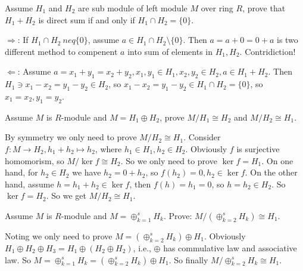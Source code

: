 \documentclass{ctexart}
\newif\ifpreface
\begin{document}
\large
\setlength{\baselineskip}{1.2em}
\ifpreface
	
	\newgeometry{left=2cm,right=2cm,top=2cm,bottom=2cm}
\else
	\maketitle
\fi
\begin{problem}\label{pro:1}
 Assume $H_1$ and $H_2$ are sub module of left module $M$ over ring $R$, prove that $H_1+H_2$ is direct sum if and only if $H_1\cap H_2 = \{0\}$. 
\end{problem}

\begin{solution}
 $\Rightarrow$: If $H_1 \cap H_2 \ neq \{0\}$, assume $a\in H_1\cap H_2\setminus \{0\}$. 
 Then $a=a+0=0+a$ is two different method to compenent $a$ into sum of elements in $H_1,H_2$. Contridiction! 

 $\Leftarrow$: Assume $a=x_1+y_1=x_2+y_2,x_1,y_1\in H_1,x_2,y_2\in H_2,a\in H_1+H_2$. 
 Then $H_1\ni x_1-x_2=y_1-y_2\in H_2$, so $x_1-x_2=y_1-y_2\in H_1\cap H_2=\{0\}$, so $x_1=x_2,y_1=y_2$.  
\end{solution}

\begin{problem}\label{pro:2}
 Assume $M$ is $R$-module and $M=H_1\oplus H_2$, prove $M/H_1\cong H_2$ and $M/H_2\cong H_1$. 
\end{problem}

\begin{solution}
 By symmetry we only need to prove $M/H_2\cong H_1$. 
 Consider $f:M\to H_2,h_1+h_2\mapsto h_2$, where $h_1\in H_1,h_2\in H_2$. 
 Obviously $f$ is surjective homomorism, so $M/\ker f\cong H_2$. 
 So we only need to prove $\ker f= H_1$. 
 On one hand, for $h_2\in H_2$ we have $h_2=0+h_2$, so $f(h_2)=0,h_2\in \ker f$. 
 On the other hand, assume $h=h_1+h_2\in \ker f$, then $f(h)=h_1=0$, so $h=h_2\in H_2$. 
 So $\ker f=H_2$. So we get $M/H_2\cong H_1$. 
\end{solution}

\begin{problem}
 Assume $M$ is $R$-module and $M=\oplus_{k=1}^s H_k$. Prove: $M/(\oplus_{k=2}^s H_k)\cong H_1$. 
\end{problem}

\begin{solution}
 Noting  we only need to prove $M=(\oplus_{k=2}^s H_k)\oplus H_1$. 
 Obviously $H_1\oplus H_2\oplus H_3=H_1\oplus(H_2\oplus H_2)$, i.e., $\oplus$ has commulative law and associative law. 
 So $M=\oplus_{k=1}^s H_k=(\oplus_{k=2}^s H_k)\oplus H_1$. 
 So finally $M/\oplus_{k=2}^s H_k\cong H_1$. 
\end{solution}
\end{document}
